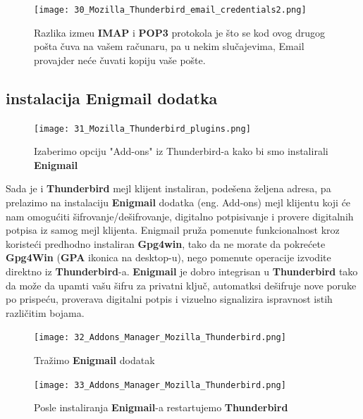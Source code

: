 \documentclass[a4paper,11pt]{article}
\begin{document}
\newpage
\begin{figure}[!h]
	\begin{center}
		\texttt{[image: 30\_Mozilla\_Thunderbird\_email\_credentials2.png]}
		\caption{Razlika izme\dj{}u \textbf{IMAP} i \textbf{POP3} protokola je \v{s}to se kod ovog drugog po\v{s}ta \v{c}uva na va\v{s}em ra\v{c}unaru, pa u nekim slu\v{c}ajevima, Email provajder ne\'{c}e \v{c}uvati kopiju va\v{s}e po\v{s}te. }
		\label{initialscreen}
	\end{center}
\end{figure}
\newpage
\newpage
\bigskip
\subsection{instalacija Enigmail dodatka}
\begin{figure}[!h]
	\begin{center}
		\texttt{[image: 31\_Mozilla\_Thunderbird\_plugins.png]}
		\caption{Izaberimo opciju "Add-ons" iz Thunderbird-a kako bi smo instalirali \textbf{Enigmail}}
		\label{initialscreen}
	\end{center}
\end{figure}

Sada je i \textbf{Thunderbird} mejl klijent instaliran, pode\v{s}ena \v{z}eljena adresa, pa prelazimo na instalaciju 
\textbf{Enigmail} dodatka (eng. Add-ons) mejl klijentu koji \'{c}e nam omogu\'{c}iti \v{s}ifrovanje/de\v{s}ifrovanje, digitalno potpisivanje i provere digitalnih potpisa iz samog mejl klijenta.
\newline Enigmail pru\v{z}a pomenute funkcionalnost kroz koriste\'{c}i predhodno instaliran \textbf{Gpg4win}, tako da ne morate da pokre\'{c}ete \textbf{Gpg4Win} (\textbf{GPA} ikonica na desktop-u), nego pomenute operacije izvodite direktno iz \textbf{Thunderbird}-a. \newline
\textbf{Enigmail} je dobro integrisan u \textbf{Thunderbird} tako da mo\v{z}e da upamti va\v{s}u \v{s}ifru za privatni klju\v{c}, automatksi de\v{s}ifruje nove poruke po prispe\'{c}u, proverava digitalni potpis i vizuelno signalizira ispravnost istih razli\v{c}itim bojama.
\newpage
\begin{figure}[!h]
	\begin{center}
		\texttt{[image: 32\_Addons\_Manager\_Mozilla\_Thunderbird.png]}
		\caption{Tra\v{z}imo \textbf{Enigmail} dodatak}
		\label{search_for_enigmail}
	\end{center}
\end{figure}

\begin{figure}[!h]
	\begin{center}
		\texttt{[image: 33\_Addons\_Manager\_Mozilla\_Thunderbird.png]}
		\caption{Posle instaliranja \textbf{Enigmail}-a restartujemo \textbf{Thunderbird}}
		\label{restart_thunderbird}
	\end{center}
\end{figure}
\newpage
\end{document}
